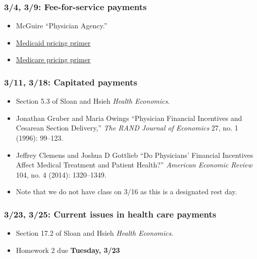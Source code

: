 \documentclass[11pt,]{article}
\providecommand{\tightlist}{%
  \setlength{\itemsep}{0pt}\setlength{\parskip}{0pt}}
\begin{document}
\hypertarget{fee-for-service-payments}{%
\subsubsection{3/4, 3/9: Fee-for-service
payments}\label{fee-for-service-payments}}

\begin{itemize}
\tightlist
\item
  McGuire ``Physician Agency.''
\item
  \href{https://www.macpac.gov/medicaid-101/}{Medicaid pricing primer}
\item
  \href{https://fas.org/sgp/crs/misc/R40425.pdf}{Medicare pricing
  primer}
\end{itemize}

\hypertarget{capitated-payments}{%
\subsubsection{3/11, 3/18: Capitated
payments}\label{capitated-payments}}

\begin{itemize}
\tightlist
\item
  Section 5.3 of Sloan and Hsieh \emph{Health Economics}.
\item
  Jonathan Gruber and Maria Owings ``Physician Financial Incentives and
  Cesarean Section Delivery,'' \emph{The RAND Journal of Economics} 27,
  no. 1 (1996): 99--123.
\item
  Jeffrey Clemens and Joshua D Gottlieb ``Do Physicians' Financial
  Incentives Affect Medical Treatment and Patient Health?''
  \emph{American Economic Review} 104, no. 4 (2014): 1320--1349.
\item
  Note that we do not have class on 3/16 as this is a designated rest
  day.
\end{itemize}

\hypertarget{current-issues-in-health-care-payments}{%
\subsubsection{3/23, 3/25: Current issues in health care
payments}\label{current-issues-in-health-care-payments}}

\begin{itemize}
\tightlist
\item
  Section 17.2 of Sloan and Hsieh \emph{Health Economics}.
\item
  Homework 2 due \textbf{Tuesday, 3/23}
\end{itemize}
\end{document}
